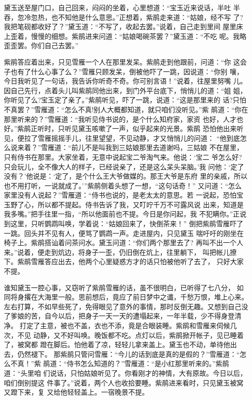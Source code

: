 黛玉送至屋门口，自己回来，闷闷的坐着，心里想道：“宝玉近来说话，半吐
半吞，忽冷忽热，也不知他是什么意思。”正想着，紫鹃走来道：“姑娘，经不写
了?我把笔砚都收好了？”黛玉道：“不写了，收起去罢。”说着，自己走到里间
屋里床上歪着，慢慢的细想。紫鹃进来问道：“姑娘喝碗茶罢？”黛玉道：“不吃
呢。我略歪歪罢。你们自己去罢。”

紫鹃答应着出来，只见雪雁一个人在那里发呆。紫鹃走到他跟前，问道：“你
这会子也有了什么心事了么？”雪雁只顾发呆，倒被他吓了一跳，因说道：“你别
嚷，今日我听见了一句话，我告诉你听奇不奇。你可别言语！”说着，往屋里努嘴
儿。因自己先行，点着头儿叫紫鹃同他出来，到门外平台底下，悄悄儿的道：“姐
姐，你听见了么?宝玉定了亲了。”紫鹃听见，吓了一跳，说道：“这是那里来的
话?只怕不真罢？”雪雁道：“怎么不真!别人大概都知道，就只咱们没听见。”紫
鹃道：“你在那里听来的？”雪雁道：“我听见侍书说的，是个什么知府家，家资
也好，人才也好。”紫鹃正听时，只听见黛玉咳嗽了一声，似乎起来的光景。紫鹃
恐怕他出来听见，便拉了雪雁摇摇手儿，往里望望，不见动静，才又悄悄儿的问道：
“他到底怎么说来着？”雪雁道：“前儿不是叫我到三姑娘那里去道谢吗，三姑娘
不在屋里，只有侍书在那里。大家坐着，无意中说起宝二爷淘气来。他说：‘宝二
爷怎么好?只会玩儿，全不像大人的样子，已经说亲了，还是这么呆头呆脑。’我
问他：‘定了没有？’他说是：‘定了，是个什么王大爷做媒的。那王大爷是东府
里的亲戚，所以也不用打听，一说就成了。’”紫鹃侧着头想了一想，“这句话奇！”
又问道：“怎么家里没有人说起？”雪雁道：“侍书也说的，是老太太的意思。若
一说起，恐怕宝玉野了心，所以都不提起。侍书告诉了我，又叮咛千万不可露风说
出来，知道是我多嘴。”把手往里一指，“所以他面前也不提。今日是你问起，我
不犯瞒你。”正说到这里，只听鹦鹉叫唤，学着说：“姑娘回来了，快倒茶来！”
倒把紫鹃雪雁吓了一跳。回头并不见有人，便骂了鹦鹉一声。走进屋内，只见黛玉
喘吁吁的刚坐在椅子上。紫鹃搭讪着问茶问水。黛玉问道：“你们两个那里去了?
再叫不出一个人来。”说着，便走到炕边，将身子一歪，仍旧倒在炕上，往里躺下，
叫把帐儿撩下。紫鹃雪雁答应出去，他两个心里疑惑方才的话只怕被他听了去了，
只好大家不提。

谁知黛玉一腔心事，又窃听了紫鹃雪雁的话，虽不很明白，已听得了七八分，
如同将身撂在大海里一般。思前想后，竟应了前日梦中之谶，千愁万恨，堆上心来。
左右打算，不如早些死了，免得眼见了意外的事情，那时反倒无趣。又想到自己没
了爹娘的苦，自今以后，把身子一天一天的遭塌起来，一年半载，少不得身登清净。
打定了主意，被也不盖，衣也不添，竟是合眼装睡。紫鹃和雪雁来伺候几次，不见
动静，又不好叫唤。晚饭都不吃。点灯以后，紫鹃掀开帐子，见已睡着了，被窝都
蹬在脚后。怕他着了凉，轻轻儿拿来盖上。黛玉也不动，单待他出去，仍然褪下。
那紫鹃只管问雪雁：“今儿的话到底是真的是假的？”雪雁道：“怎么不真！”紫
鹃道：“侍书怎么知道的？”雪雁道：“是小红那里听来的。”紫鹃道：“头里咱
们说话，只怕姑娘听见了。你看刚才的神情，大有原故。今日以后，咱们倒别提这
件事了。”说着，两个人也收拾要睡。紫鹃进来看时，只见黛玉被窝又蹬下来，复
又给他轻轻盖上。一宿晚景不提。

